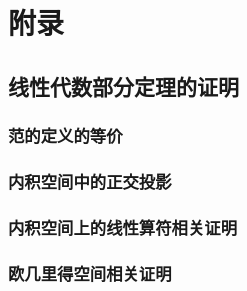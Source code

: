 \documentclass[
  zihao=5,
  a4paper,
  heading=true,
  twoside
]{ctexbook}
\theoremstyle{definition}
\theoremstyle{plain}
\begin{document}


\appendix
\newpage\part{附录}
\chapter{线性代数部分定理的证明}\label{sec:A}
\section{范的定义的等价}\label{sec:A.1}


\section{内积空间中的正交投影}\label{sec:A.2}


\section{内积空间上的线性算符相关证明}\label{sec:A.3}


\section{欧几里得空间相关证明}\label{sec:A.4}

\end{document}
